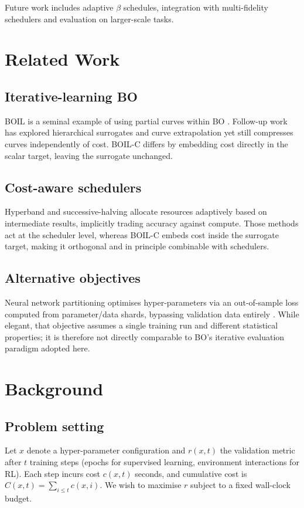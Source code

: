 \documentclass{article} %
\begin{document}
Future work includes adaptive \(\beta\) schedules, integration with multi-fidelity schedulers and evaluation on larger-scale tasks.

\section{Related Work}
\label{sec:related}
\subsection{Iterative-learning BO}
BOIL is a seminal example of using partial curves within BO \cite{nguyen-2019-bayesian}. Follow-up work has explored hierarchical surrogates and curve extrapolation yet still compresses curves independently of cost. BOIL-C differs by embedding cost directly in the scalar target, leaving the surrogate unchanged.

\subsection{Cost-aware schedulers}
Hyperband and successive-halving allocate resources adaptively based on intermediate results, implicitly trading accuracy against compute. Those methods act at the scheduler level, whereas BOIL-C embeds cost inside the surrogate target, making it orthogonal and in principle combinable with schedulers.

\subsection{Alternative objectives}
Neural network partitioning optimises hyper-parameters via an out-of-sample loss computed from parameter/data shards, bypassing validation data entirely \cite{mlodozeniec-2023-hyperparameter}. While elegant, that objective assumes a single training run and different statistical properties; it is therefore not directly comparable to BO's iterative evaluation paradigm adopted here.

\section{Background}
\label{sec:background}
\subsection{Problem setting}
Let \(x\) denote a hyper-parameter configuration and \(r(x,t)\) the validation metric after \(t\) training steps (epochs for supervised learning, environment interactions for RL). Each step incurs cost \(c(x,t)\) seconds, and cumulative cost is \(C(x,t)=\sum_{i\le t} c(x,i)\). We wish to maximise \(r\) subject to a fixed wall-clock budget.
\end{document}
